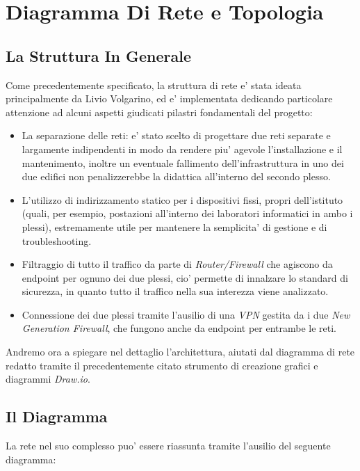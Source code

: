 \documentclass{report}
\begin{document}
	\chapter{Diagramma Di Rete e Topologia}
	\begin{sloppypar}
		\author{Livio Volgarino}
		\section{La Struttura In Generale}
			Come precedentemente specificato, la struttura di rete e' stata ideata principalmente da Livio Volgarino, ed e'
			implementata dedicando particolare attenzione ad alcuni aspetti giudicati pilastri fondamentali del progetto:
			\begin{itemize}
				\item La separazione delle reti: e' stato scelto di progettare due reti separate e largamente indipendenti
					in modo da rendere piu' agevole l'installazione e il mantenimento, inoltre un eventuale fallimento
					dell'infrastruttura in uno dei due edifici non penalizzerebbe la didattica all'interno del secondo plesso.
				\item L'utilizzo di indirizzamento statico per i dispositivi fissi, propri dell'istituto (quali, per esempio,
					postazioni all'interno dei laboratori informatici in ambo i plessi), estremamente utile per mantenere
					la semplicita' di gestione e di troubleshooting.
				\item Filtraggio di tutto il traffico da parte di \emph{Router/Firewall} che agiscono da endpoint per ognuno dei due
					plessi, cio' permette di innalzare lo standard di sicurezza, in quanto tutto il traffico nella sua interezza
					viene analizzato.
				\item Connessione dei due plessi tramite l'ausilio di una \emph{VPN} gestita da i due \emph{New Generation
					Firewall}, che fungono anche da endpoint per entrambe le reti.
			\end{itemize}
			Andremo ora a spiegare nel dettaglio l'architettura, aiutati dal diagramma di rete redatto tramite il precedentemente
			citato strumento di creazione grafici e diagrammi \emph{Draw.io}.
		\section{Il Diagramma}
			La rete nel suo complesso puo' essere riassunta tramite l'ausilio del seguente diagramma:


\end{sloppypar}
\end{document}
